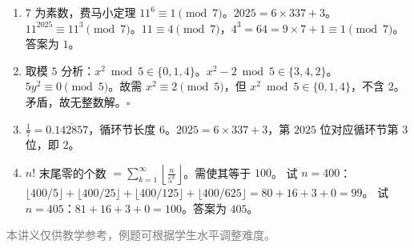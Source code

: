 \documentclass[12pt, a4paper]{ctexart}
\begin{document}
\begin{knowledgebox}[参考答案]
\begin{enumerate}
  \item $7$ 为素数，费马小定理 $11^6 \equiv 1 \pmod{7}$。$2025 = 6 \times 337 + 3$。$11^{2025} \equiv 11^3 \pmod{7}$。$11 \equiv 4 \pmod{7}$，$4^3 = 64 = 9 \times 7 + 1 \equiv 1 \pmod{7}$。答案为 $\boxed{1}$。

  \item 取模 $5$ 分析：$x^2 \bmod 5 \in \{0, 1, 4\}$。$x^2 - 2 \bmod 5 \in \{3, 4, 2\}$。$5y^2 \equiv 0 \pmod{5}$。故需 $x^2 \equiv 2 \pmod{5}$，但 $x^2 \bmod 5 \in \{0, 1, 4\}$，不含 $2$。矛盾，故无整数解。$\square$

  \item $\tfrac{1}{7} = 0.\overline{142857}$，循环节长度 $6$。$2025 = 6 \times 337 + 3$，第 $2025$ 位对应循环节第 $3$ 位，即 $\boxed{2}$。

  \item $n!$ 末尾零的个数 $= \displaystyle\sum_{k=1}^{\infty} \left\lfloor \frac{n}{5^k} \right\rfloor$。需使其等于 $100$。
  试 $n = 400$：$\lfloor 400/5 \rfloor + \lfloor 400/25 \rfloor + \lfloor 400/125 \rfloor + \lfloor 400/625 \rfloor = 80 + 16 + 3 + 0 = 99$。
  试 $n = 405$：$81 + 16 + 3 + 0 = 100$。答案为 $\boxed{405}$。
\end{enumerate}
\end{knowledgebox}

\vfill
\begin{center}
\small\textcolor{gray}{本讲义仅供教学参考，例题可根据学生水平调整难度。}
\end{center}
\end{document}
